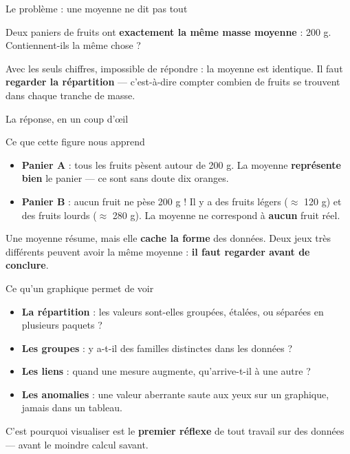 \documentclass[aspectratio=169,11pt]{beamer}
\begin{document}
\begin{frame}{Le problème : une moyenne ne dit pas tout}
\begin{ucadfront}
{\small Deux paniers de fruits ont \textbf{exactement la même masse moyenne} : 200 g. Contiennent-ils la même chose ?}
\end{ucadfront}
{\small Avec les seuls chiffres, impossible de répondre : la moyenne est identique. Il faut \textbf{regarder la répartition} — c'est-à-dire compter combien de fruits se trouvent dans chaque tranche de masse.}
\end{frame}

\begin{frame}{La réponse, en un coup d'œil}
\end{frame}

\begin{frame}{Ce que cette figure nous apprend}
\begin{itemize}\small
  \item \textbf{Panier A} : tous les fruits pèsent autour de 200 g. La moyenne \textbf{représente bien} le panier — ce sont sans doute dix oranges.
  \item \textbf{Panier B} : aucun fruit ne pèse 200 g ! Il y a des fruits légers ($\approx$ 120 g) et des fruits lourds ($\approx$ 280 g). La moyenne ne correspond à \textbf{aucun} fruit réel.
\end{itemize}
\begin{ucadret}[À retenir]
{\small Une moyenne résume, mais elle \textbf{cache la forme} des données. Deux jeux très différents peuvent avoir la même moyenne : \textbf{il faut regarder avant de conclure}.}
\end{ucadret}
\end{frame}

\begin{frame}{Ce qu'un graphique permet de voir}
\begin{itemize}\small
  \item \textbf{La répartition} : les valeurs sont-elles groupées, étalées, ou séparées en plusieurs paquets ?
  \item \textbf{Les groupes} : y a-t-il des familles distinctes dans les données ?
  \item \textbf{Les liens} : quand une mesure augmente, qu'arrive-t-il à une autre ?
  \item \textbf{Les anomalies} : une valeur aberrante saute aux yeux sur un graphique, jamais dans un tableau.
\end{itemize}
{\small C'est pourquoi visualiser est le \textbf{premier réflexe} de tout travail sur des données — avant le moindre calcul savant.}
\end{frame}
\end{document}
